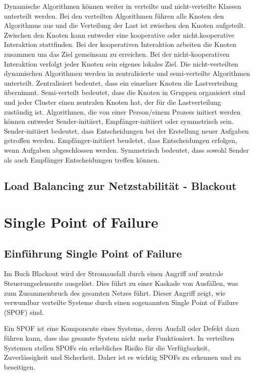 \documentclass[a4paper,12pt]{article}
\let\stdsection\section
\renewcommand\section{\newpage\stdsection}
\begin{document}
Dynamische Algorithmen können weiter in verteilte und nicht-verteilte Klassen unterteilt werden. Bei den verteilten Algorithmen führen alle Knoten den Algorithmus aus und die Verteilung der Last ist zwischen den Knoten aufgeteilt. Zwischen den Knoten kann entweder eine kooperative oder nicht.kooperative Interaktion stattfinden. Bei der kooperativen Interaktion arbeiten die Knoten zusammen um das Ziel gemeinsam zu erreichen. Bei der nicht-kooperativen Interaktion verfolgt jeder Knoten sein eigenes lokales Ziel. Die nicht-verteilten dynamischen Algorithmen werden in zentralisierte und semi-verteilte Algorithmen unterteilt. Zentralisiert bedeutet, dass ein einzelner Knoten die Lastverteilung übernimmt. Semi-verteilt bedeutet, dass die Knoten in Gruppen organisiert sind und jeder Cluster einen zentralen Knoten hat, der für die Lastverteilung zuständig ist. 
\newline
Algorithmen, die von einer Person/einem Prozess initiert werden können entweder Sender-initiiert, Empfänger-initiiert oder symmetrisch sein.
Sender-initiiert bedeutet, dass Entscheidungen bei der Erstellung neuer Aufgaben getroffen werden. Empfänger-initiiert beudetet, dass Entscheidungen erfolgen, wenn Aufgaben abgeschlossen werden. Symmetrisch bedeutet, dass sowohl Sender als auch Empfänger Entscheidungen treffen können. \cite[S. 3]{LoadBalancing}

\subsection{Load Balancing zur Netzstabilität - Blackout}

\section{Single Point of Failure}

\subsection{Einführung Single Point of Failure}

Im Buch Blackout wird der Stromausfall durch einen Angriff auf zentrale Steuerungselemente ausgelöst. Dies führt zu einer Kaskade von Ausfällen, was zum Zusammenbruch des gesamten Netzes führt. Dieser Angriff zeigt, wie verwundbar verteilte Systeme durch einen sogenannten Single Point of Failure (SPOF) sind.

Ein SPOF ist eine Komponente eines Systems, deren Ausfall oder Defekt dazu führen kann, dass das gesamte System nicht mehr Funktioniert. In verteilten Systemen stellen SPOFs ein erhebliches Risiko für die Verfügbarkeit, Zuverlässigkeit und Sicherheit. Daher ist es wichtig SPOFs zu erkennen und zu beseitigen. 
\end{document}
